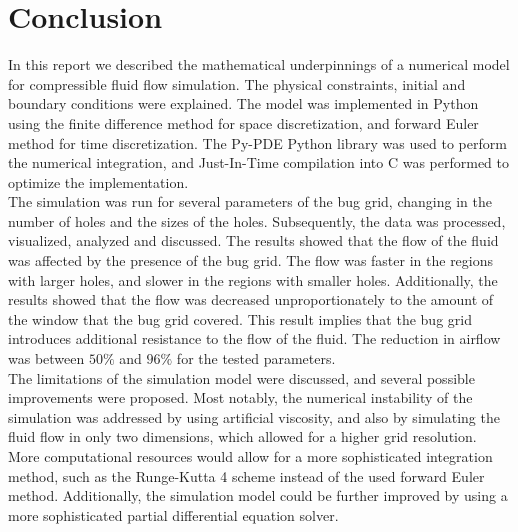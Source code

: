 \section{Conclusion} \label{section: conclusion}
In this report we described the mathematical underpinnings of a numerical model for compressible fluid flow simulation. The physical constraints, initial and boundary conditions were explained. The model was implemented in Python using the finite difference method for space discretization, and forward Euler method for time discretization. The Py-PDE Python library was used to perform the numerical integration, and Just-In-Time compilation into C was performed to optimize the implementation.\\

The simulation was run for several parameters of the bug grid, changing in the number of holes and the sizes of the holes. Subsequently, the data was processed, visualized, analyzed and discussed. The results showed that the flow of the fluid was affected by the presence of the bug grid. The flow was faster in the regions with larger holes, and slower in the regions with smaller holes. Additionally, the results showed that the flow was decreased unproportionately to the amount of the window that the bug grid covered. This result implies that the bug grid introduces additional resistance to the flow of the fluid. The reduction in airflow was between $50\%$ and $96\%$ for the tested parameters. \\

The limitations of the simulation model were discussed, and several possible improvements were proposed. Most notably, the numerical instability of the simulation was addressed by using artificial viscosity, and also by simulating the fluid flow in only two dimensions, which allowed for a higher grid resolution. More computational resources would allow for a more sophisticated integration method, such as the Runge-Kutta 4 scheme instead of the used forward Euler method.
Additionally, the simulation model could be further improved by using a more sophisticated partial differential equation solver.